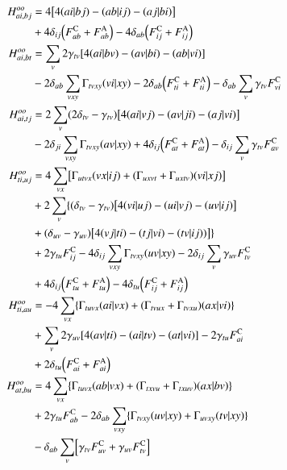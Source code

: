 \documentclass[aps,prb,reprint,showkeys,superscriptaddress]{revtex4-1}
\begin{document}
\begin{subequations}
\begin{align}
  H^{oo}_{ai,bj} &= 4\mleft[ 4\ceri{ai}{bj}-\ceri{ab}{ij}-\ceri{aj}{bi} \mright] \\
  &+ 4 \delta_{ij} \mleft( \FC{ab}+\FA{ab} \mright) - 4 \delta_{ab}\mleft(\FC{ij}+\FA{ij}\mright) \notag \\
  H^{oo}_{ai,bt} &= \sum_{v} 2\gamma_{tv}\mleft[4\ceri{ai}{bv}-\ceri{av}{bi}-\ceri{ab}{vi}\mright] \\
  &- 2\delta_{ab}\sum_{vxy} \Gamma_{tvxy}\ceri{vi}{xy} - 2 \delta_{ab}\mleft(\FC{ti}+\FA{ti}\mright) - \delta_{ab}\sum_v\gamma_{tv}\FC{vi} \notag \\
  H^{oo}_{ai,tj} &= 2 \sum_v (2\delta_{tv} - \gamma_{tv})\mleft[4\ceri{ai}{vj}-\ceri{av}{ji}-\ceri{aj}{vi}\mright] \\*
               &- 2\delta_{ji}\sum_{vxy} \Gamma_{tvxy}\ceri{av}{xy} + 4\delta_{ij}\mleft(\FC{at}+\FA{at}\mright) - \delta_{ij}\sum_v\gamma_{tv}\FC{av}\notag \\ 
  H^{oo}_{ti,uj} &= 4\sum_{vx}\mleft[\Gamma_{utvx}\ceri{vx}{ij}+(\Gamma_{uxvt}+\Gamma_{uxtv})\ceri{vi}{xj}\mright] \\
                 &+ 2\sum_v\{(\delta_{tv}-\gamma_{tv})\mleft[4\ceri{vi}{uj}-\ceri{ui}{vj}-\ceri{uv}{ij}\mright] \notag \\
  &+(\delta_{uv}-\gamma_{uv})\mleft[4\ceri{vj}{ti}-\ceri{tj}{vi}-\ceri{tv}{ij})\mright]\} \notag \\
                 &+2\gamma_{tu}\FC{ij}-4\delta_{ij}\sum_{vxy}\Gamma_{tvxy}\ceri{uv}{xy}-2\delta_{ij}\sum_v\gamma_{uv}\FC{tv} \notag \\
  &+ 4\delta_{ij}\mleft(\FC{tu}+\FA{tu}\mright)-4\delta_{tu}\mleft(\FC{ij}+\FA{ij}\mright) \notag \\
  H^{oo}_{ti,au} &= -4 \sum_{vx}\{\Gamma_{tuvx}\ceri{ai}{vx} + (\Gamma_{tvux}+\Gamma_{tvxu})\ceri{ax}{vi}\} \\
                 &+ \sum_v2\gamma_{uv}\mleft[4\ceri{av}{ti}-\ceri{ai}{tv}-\ceri{at}{vi}\mright] -2\gamma_{tu}\FC{ai} \notag \\
  &+2\delta_{tu}\mleft(\FC{ai}+\FA{ai}\mright) \notag \\
  H^{oo}_{at,bu} &= 4\sum_{vx}\{\Gamma_{tuvx}\ceri{ab}{vx} + (\Gamma_{txvu}+\Gamma_{txuv})\ceri{ax}{bv}\} \\
                 &+ 2\gamma_{tu}\FC{ab} \notag -2\delta_{ab}\sum_{vxy}\{\Gamma_{tvxy}\ceri{uv}{xy}+\Gamma_{uvxy}\ceri{tv}{xy}\} \notag \\
  &-\delta_{ab}\sum_v\mleft[\gamma_{tv}\FC{uv}+\gamma_{uv}\FC{tv}\mright] \notag
\end{align}
\end{subequations}
\end{document}
